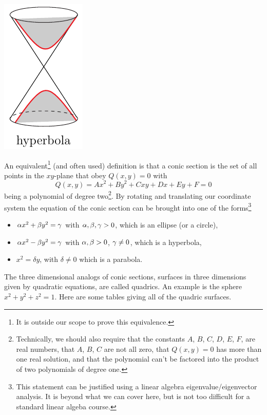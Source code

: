 {\begin{efig}
\begin{center}
    \includegraphics{conePlaneHyperbola.pdf}
\end{center}
\end{efig}
}
An equivalent\footnote{It is outside our scope to prove this equivalence.} 
(and often used) definition is that a conic section is the set of all points  
in the $xy$-plane that obey $Q(x,y)=0$ with
\begin{equation*}
Q(x,y) = Ax^2 + By^2 + Cxy + Dx + Ey + F =0
\end{equation*}
being a polynomial of degree two\footnote{Technically, we should also require
that the constants $A$, $B$, $C$, $D$, $E$, $F$, are real numbers,
that $A$, $B$, $C$ are not all zero, that $Q(x,y)=0$ has more than one 
real solution, and that the polynomial can't be factored
into the product of two polynomials of degree one.}.
By rotating and translating  our coordinate system the equation of the conic section can be brought
into one of the forms\footnote{This statement can be justified using a 
linear algebra eigenvalue/eigenvector analysis. It is 
beyond what we can cover here, but is not too difficult for a standard 
linear algeba course.}
\begin{itemize}
\item
$\alpha x^2 + \beta y^2 =\gamma$ with $\alpha,\beta,\gamma >0$, which is an ellipse
(or a circle),
\item
$\alpha x^2 - \beta y^2 =\gamma$ with $\alpha,\beta>0$, $\gamma\ne0$, which is a hyperbola,
\item 
$x^2 = \delta y$, with $\delta\ne 0$ which is a parabola.
\end{itemize}
\goodbreak

The three dimensional analogs of conic sections, surfaces 
in three dimensions given by quadratic equations, are called quadrics.
An example is the sphere $x^2+y^2+z^2=1$. Here are some tables giving
all of the quadric surfaces.

